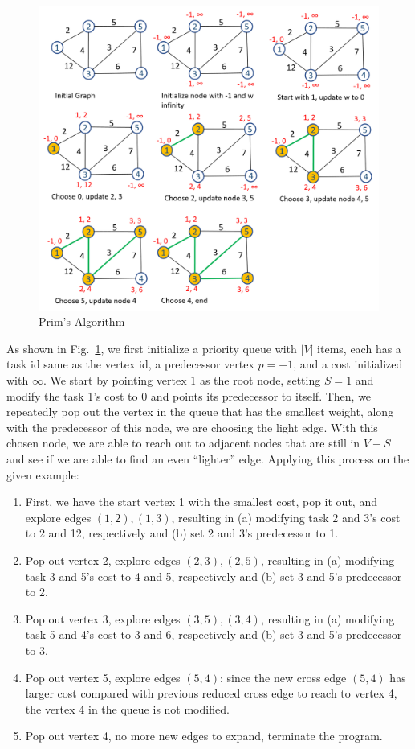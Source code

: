 \documentclass[../main.tex]{subfiles}
\begin{document}
  \begin{figure}[!ht]
     \centering
     \includegraphics[width=0.99\columnwidth]{fig/mst_prim_1.png}
     \caption{Prim's Algorithm}
     \label{fig:prim_2}
 \end{figure}
 As shown in Fig.~\ref{fig:prim_2}, we first initialize a priority queue with $|V|$ items, each has a task id same as the vertex id, a predecessor vertex $p=-1$, and a cost initialized with $\infty$. We start by pointing vertex $1$ as the root node, setting $S={1}$ and modify the task 1's cost to 0 and points its predecessor to itself. Then, we repeatedly pop out the vertex in the queue that has the smallest weight, along with the predecessor of this node, we are choosing the light edge. With this chosen node, we are able to reach out to adjacent nodes that are still in $V-S$ and see if we are able to find an even ``lighter'' edge.  Applying this process on the given example:
 \begin{enumerate}
     \item First, we  have the start vertex 1 with the smallest cost, pop it out, and explore edges $(1,2), (1, 3)$, resulting in (a) modifying task 2 and 3's cost to 2 and 12, respectively and (b) set 2 and 3's predecessor to 1.
     \item Pop out vertex 2, explore edges $(2,3), (2,5)$, resulting in (a) modifying task 3 and 5's cost to 4 and 5, respectively and (b) set 3 and 5's predecessor to 2.
     \item Pop out vertex 3, explore edges $(3, 5), (3,4)$, resulting in (a) modifying task 5 and 4's cost to 3 and 6, respectively and (b) set 3 and 5's predecessor to 3.
     \item Pop out vertex 5, explore edges $(5, 4)$: since the new cross edge $(5,4)$ has larger cost compared with previous reduced cross edge to reach to vertex 4, the vertex 4 in the queue is not modified. 
     \item Pop out vertex 4, no more new edges to expand, terminate the program. 
 \end{enumerate}
\end{document}

